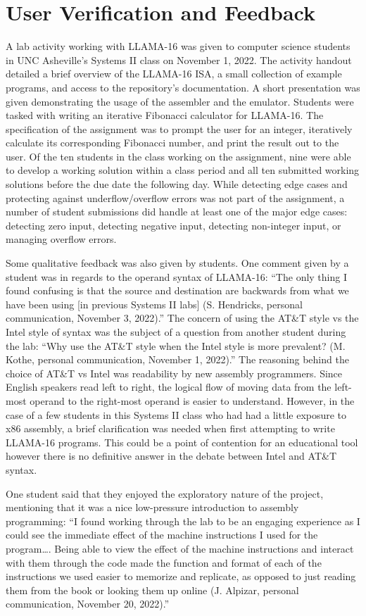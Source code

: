 \documentclass[man,hidelinks,floatsintext]{apa7}
\begin{document}
\section{User Verification and Feedback}
A lab activity working with LLAMA-16 was given to computer science students in UNC Asheville's Systems II class on November 1, 2022. The activity handout detailed a brief overview of the LLAMA-16 ISA, a small collection of example programs, and access to the repository's documentation. A short presentation was given demonstrating the usage of the assembler and the emulator. Students were tasked with writing an iterative Fibonacci calculator for LLAMA-16. The specification of the assignment was to prompt the user for an integer, iteratively calculate its corresponding Fibonacci number, and print the result out to the user. Of the ten students in the class working on the assignment, nine were able to develop a working solution within a class period and all ten submitted working solutions before the due date the following day. While detecting edge cases and protecting against underflow/overflow errors was not part of the assignment, a number of student submissions did handle at least one of the major edge cases: detecting zero input, detecting negative input, detecting non-integer input, or managing overflow errors.\par
Some qualitative feedback was also given by students. One comment given by a student was in regards to the operand syntax of LLAMA-16: ``The only thing I found confusing is that the source and destination are backwards from what we have been using [in previous Systems II labs] (S. Hendricks, personal communication, November 3, 2022).'' The concern of using the AT\&T style vs the Intel style of syntax was the subject of a question from another student during the lab: ``Why use the AT\&T style when the Intel style is more prevalent? (M. Kothe, personal communication, November 1, 2022).'' The reasoning behind the choice of AT\&T vs Intel was readability by new assembly programmers. Since English speakers read left to right, the logical flow of moving data from the left-most operand to the right-most operand is easier to understand. However, in the case of a few students in this Systems II class who had had a little exposure to x86 assembly, a brief clarification was needed when first attempting to write LLAMA-16 programs. This could be a point of contention for an educational tool however there is no definitive answer in the debate between Intel and AT\&T syntax.\par
One student said that they enjoyed the exploratory nature of the project, mentioning that it was a nice low-pressure introduction to assembly programming: ``I found working through the lab to be an engaging experience as I could see the immediate effect of the machine instructions I used for the program\ldots. Being able to view the effect of the machine instructions and interact with them through the code made the function and format of each of the instructions we used easier to memorize and replicate, as opposed to just reading them from the book or looking them up online (J. Alpizar, personal communication, November 20, 2022).''
\end{document}
